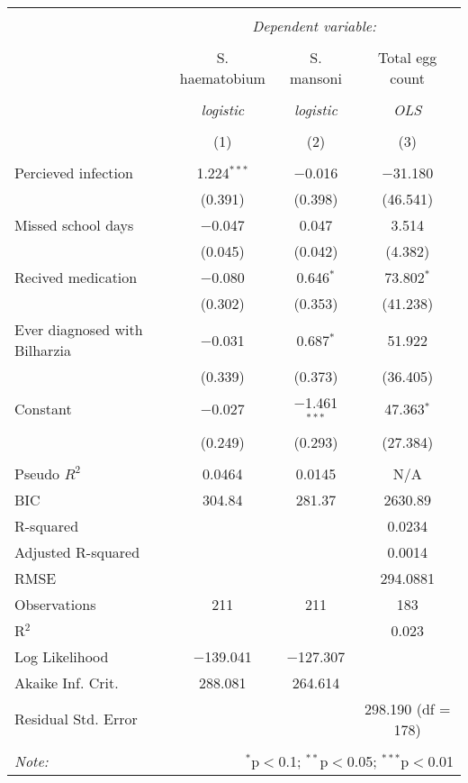
\begin{table}[!htbp] \centering 
  \caption{} 
  \label{} 
\begin{tabular}{@{\extracolsep{3pt}}lccc} 
\\[-1.8ex]\hline 
\hline \\[-1.8ex] 
 & \multicolumn{3}{c}{\textit{Dependent variable:}} \\ 
\cline{2-4} 
\\[-1.8ex] & S. haematobium & S. mansoni & Total egg count \\ 
\\[-1.8ex] & \textit{logistic} & \textit{logistic} & \textit{OLS} \\ 
\\[-1.8ex] & (1) & (2) & (3)\\ 
\hline \\[-1.8ex] 
 Percieved infection & 1.224$^{***}$ & $-$0.016 & $-$31.180 \\ 
  & (0.391) & (0.398) & (46.541) \\ 
  Missed school days & $-$0.047 & 0.047 & 3.514 \\ 
  & (0.045) & (0.042) & (4.382) \\ 
  Recived medication & $-$0.080 & 0.646$^{*}$ & 73.802$^{*}$ \\ 
  & (0.302) & (0.353) & (41.238) \\ 
  Ever diagnosed with Bilharzia & $-$0.031 & 0.687$^{*}$ & 51.922 \\ 
  & (0.339) & (0.373) & (36.405) \\ 
  Constant & $-$0.027 & $-$1.461$^{***}$ & 47.363$^{*}$ \\ 
  & (0.249) & (0.293) & (27.384) \\ 
 \hline \\[-1.8ex] 
Pseudo $R^2$ & 0.0464 & 0.0145 & N/A \\ 
BIC & 304.84 & 281.37 & 2630.89 \\ 
R-squared &  &  & 0.0234 \\ 
Adjusted R-squared &  &  & 0.0014 \\ 
RMSE &  &  & 294.0881 \\ 
Observations & 211 & 211 & 183 \\ 
R$^{2}$ &  &  & 0.023 \\ 
Log Likelihood & $-$139.041 & $-$127.307 &  \\ 
Akaike Inf. Crit. & 288.081 & 264.614 &  \\ 
Residual Std. Error &  &  & 298.190 (df = 178) \\ 
\hline 
\hline \\[-1.8ex] 
\textit{Note:}  & \multicolumn{3}{r}{$^{*}$p$<$0.1; $^{**}$p$<$0.05; $^{***}$p$<$0.01} \\ 
\end{tabular} 
\end{table} 
